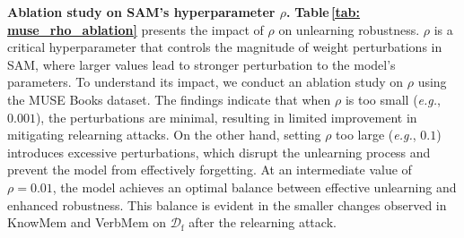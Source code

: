 




\textbf{Ablation study on SAM's hyperparameter $\rho$.}
\textbf{Table\,\ref{tab: muse_rho_ablation}} presents the impact of $\rho$ on unlearning robustness. $\rho$ is a critical hyperparameter that controls the magnitude of weight perturbations in SAM, where larger values lead to stronger perturbation to the model's parameters. To understand its impact, we conduct an ablation study on $\rho$ using the MUSE Books dataset. The findings indicate that when $\rho$ is too small (\textit{e.g.}, $0.001$), the perturbations are minimal, resulting in limited improvement in mitigating relearning attacks. On the other hand, setting $\rho$ too large (\textit{e.g.}, $0.1$) introduces excessive perturbations, which disrupt the unlearning process and prevent the model from effectively forgetting. At an intermediate value of $\rho = 0.01$, the model achieves an optimal balance between effective unlearning and enhanced robustness. This balance is evident in the smaller changes observed in KnowMem and VerbMem on $\mathcal{D}_\mathrm{f}$ after the relearning attack.



